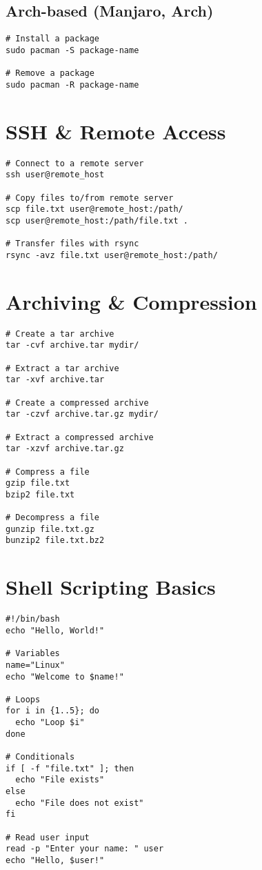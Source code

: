 \documentclass[11pt]{article}
\begin{document}
    \subsection*{Arch-based (Manjaro, Arch)}
    \begin{lstlisting}[style=linuxStyle]
# Install a package
sudo pacman -S package-name

# Remove a package
sudo pacman -R package-name
    \end{lstlisting}

    \section*{SSH & Remote Access}
    \begin{lstlisting}[style=linuxStyle]
# Connect to a remote server
ssh user@remote_host

# Copy files to/from remote server
scp file.txt user@remote_host:/path/
scp user@remote_host:/path/file.txt .

# Transfer files with rsync
rsync -avz file.txt user@remote_host:/path/
    \end{lstlisting}

    \section*{Archiving & Compression}
    \begin{lstlisting}[style=linuxStyle]
# Create a tar archive
tar -cvf archive.tar mydir/

# Extract a tar archive
tar -xvf archive.tar

# Create a compressed archive
tar -czvf archive.tar.gz mydir/

# Extract a compressed archive
tar -xzvf archive.tar.gz

# Compress a file
gzip file.txt
bzip2 file.txt

# Decompress a file
gunzip file.txt.gz
bunzip2 file.txt.bz2
    \end{lstlisting}

    \section*{Shell Scripting Basics}
    \begin{lstlisting}[style=linuxStyle]
#!/bin/bash
echo "Hello, World!"

# Variables
name="Linux"
echo "Welcome to $name!"

# Loops
for i in {1..5}; do
  echo "Loop $i"
done

# Conditionals
if [ -f "file.txt" ]; then
  echo "File exists"
else
  echo "File does not exist"
fi

# Read user input
read -p "Enter your name: " user
echo "Hello, $user!"
    \end{lstlisting}
\end{document}
